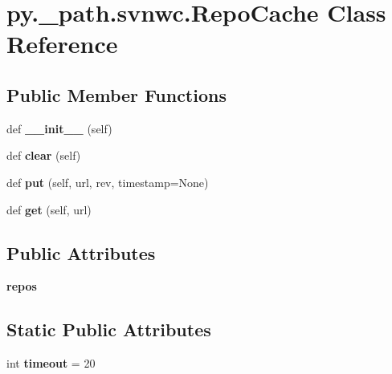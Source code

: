 \hypertarget{classpy_1_1__path_1_1svnwc_1_1_repo_cache}{}\section{py.\+\_\+path.\+svnwc.\+Repo\+Cache Class Reference}
\label{classpy_1_1__path_1_1svnwc_1_1_repo_cache}
\subsection*{Public Member Functions}
\begin{DoxyCompactItemize}
\item 
\mbox{\label{classpy_1_1__path_1_1svnwc_1_1_repo_cache_a01e0b6e93c9bfcd47b3fdad688b30e48}} 
def {\bfseries \+\_\+\+\_\+init\+\_\+\+\_\+} (self)
\item 
\mbox{\label{classpy_1_1__path_1_1svnwc_1_1_repo_cache_a64dd4fa7abf932c62cfeb509456e071f}} 
def {\bfseries clear} (self)
\item 
\mbox{\label{classpy_1_1__path_1_1svnwc_1_1_repo_cache_a392edacbed4e668095c7d28a873ca494}} 
def {\bfseries put} (self, url, rev, timestamp=None)
\item 
\mbox{\label{classpy_1_1__path_1_1svnwc_1_1_repo_cache_aa695f358132712b0f2ca079ab858a227}} 
def {\bfseries get} (self, url)
\end{DoxyCompactItemize}
\subsection*{Public Attributes}
\begin{DoxyCompactItemize}
\item 
\mbox{\label{classpy_1_1__path_1_1svnwc_1_1_repo_cache_a1e45e6cc1324eac5a0849597de9b7759}} 
{\bfseries repos}
\end{DoxyCompactItemize}
\subsection*{Static Public Attributes}
\begin{DoxyCompactItemize}
\item 
\mbox{\label{classpy_1_1__path_1_1svnwc_1_1_repo_cache_ae31929b1275060cefb9747719c953bee}} 
int {\bfseries timeout} = 20
\end{DoxyCompactItemize}


